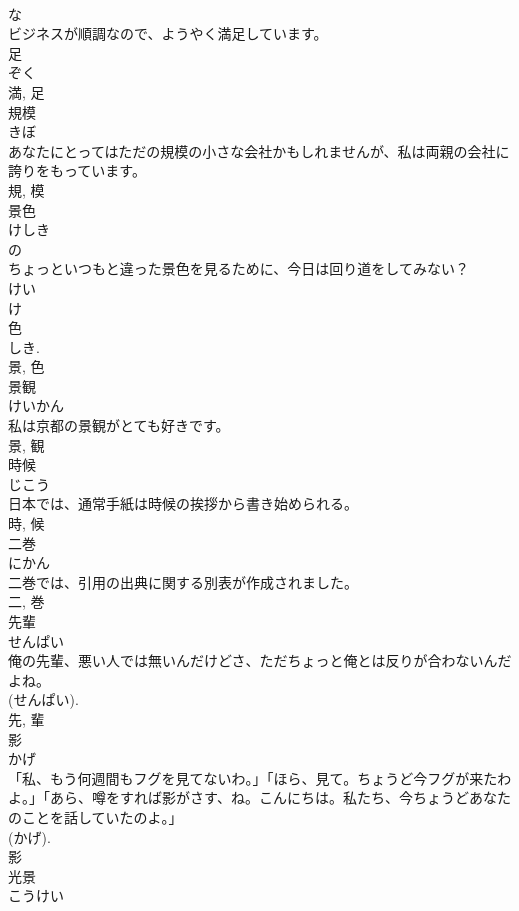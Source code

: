 \documentclass[8pt]{extreport}
\begin{document}
\begin{CJK}{UTF8}{min}
\\	な 
\\	ビジネスが順調なので、ようやく満足しています。	
\\	足 
\\	ぞく 
\\	満, 足	
\\	規模	
\\	きぼ	
\\	あなたにとってはただの規模の小さな会社かもしれませんが、私は両親の会社に誇りをもっています。	
\\	規, 模	
\\	景色	
\\	けしき	
\\	の 
\\	ちょっといつもと違った景色を見るために、今日は回り道をしてみない？	
\\	けい 
\\	け 
\\	色 
\\	しき. 
\\	景, 色	
\\	景観	
\\	けいかん	
\\	私は京都の景観がとても好きです。	
\\	景, 観	
\\	時候	
\\	じこう	
\\	日本では、通常手紙は時候の挨拶から書き始められる。	
\\	時, 候	
\\	二巻	
\\	にかん	
\\	二巻では、引用の出典に関する別表が作成されました。	
\\	二, 巻	
\\	先輩	
\\	せんぱい	
\\	俺の先輩、悪い人では無いんだけどさ、ただちょっと俺とは反りが合わないんだよね。	
\\	(せんぱい).	
\\	先, 輩	
\\	影	
\\	かげ	
\\	「私、もう何週間もフグを見てないわ。」「ほら、見て。ちょうど今フグが来たわよ。」「あら、噂をすれば影がさす、ね。こんにちは。私たち、今ちょうどあなたのことを話していたのよ。」	
\\	(かげ). 
\\	影	
\\	光景	
\\	こうけい	

\end{CJK}
\end{document}
